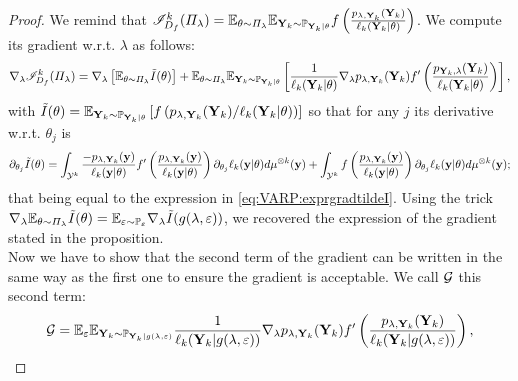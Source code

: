 \begin{proof}
    We remind that $\mathscr{I}^k_{D_f}(\varPi_\lambda)=\mathbb{E}_{\theta\sim\varPi_\lambda}\mathbb{E}_{\mathbf{Y}_k\sim\mathbb{P}_{\mathbf{Y}_k|\theta}}f\left(\frac{p_{\lambda,\mathbf{Y}_k}(\mathbf{Y}_k)}{\ell_k(\mathbf{Y}_k|\theta)}\right)$. 
    We compute its gradient w.r.t. $\lambda$ as follows: %
        \begin{align}
            \nabla_\lambda\mathscr{I}_{D_f}^k(\varPi_\lambda) = \nabla_\lambda\left[\mathbb{E}_{\theta\sim\varPi_\lambda}\tilde I(\theta)\right] + \mathbb{E}_{\theta\sim\varPi_\lambda}\mathbb{E}_{\mathbf{Y}_k\sim\mathbb{P}_{\mathbf{Y}_k|\theta}}\left[\frac{1}{\ell_k(\mathbf{Y}_k|\theta)}\nabla_\lambda p_{\lambda,\mathbf{Y}_k}(\mathbf{Y}_k)f'\left(\frac{p_{\mathbf{Y}_k,\lambda}(\mathbf{Y}_k)}{\ell_k(\mathbf{Y}_k|\theta)}\right)  \right],
        \end{align}
    with $\tilde I(\theta) = \mathbb{E}_{\mathbf{Y}_{k}\sim\mathbb{P}_{\mathbf{Y}_k|\theta}}\left[f\left({p_{\lambda,\mathbf{Y}_k}(\mathbf{Y}_k)}/{\ell_k(\mathbf{Y}_k|\theta)}\right)\right]  $ so that for any $j$ its derivative w.r.t. $\theta_j$ is 
        \begin{equation}
            \partial_{\theta_j}\tilde I(\theta) = %
             \int_{\cY^k} \frac{-p_{\lambda,\mbf Y_k}(\mbf y)}{\ell_k(\mbf y|\theta)} f'\left(\frac{p_{\lambda,\mbf Y_k}(\mbf y)}{\ell_k(\mbf y|\theta)}\right)\partial_{\theta_j}\ell_k(\mbf y|\theta) d\mu^{\otimes k}(\mbf y) + \int_{\cY^k}f\left(\frac{p_{\lambda,\mbf Y_k}(\mbf y)}{\ell_k(\mbf y|\theta)}\right)\partial_{\theta_j}\ell_k(\mbf y|\theta)d\mu^{\otimes k}(\mbf y);
        \end{equation}
    that being equal to the expression in \cref{eq:VARP:exprgradtildeI}. 
    Using the trick $\nabla_\lambda\mathbb{E}_{\theta\sim\varPi_\lambda}\tilde I(\theta)=\mathbb{E}_{\varepsilon\sim\mathbb{P}_\varepsilon}\nabla_\lambda\tilde I(g(\lambda,\varepsilon)) $, we recovered the expression of the gradient stated in the proposition.\\
    Now we have to show that the second term of the gradient can be written in the same way as the first one to ensure the gradient is acceptable. We call $\mathcal{G}$ this second term: 
        \begin{equation}
        \cG %
        = \EE_\eps\EE_{\mbf Y_k\sim\PP_{\mbf Y_k|g(\lambda,\eps)}}\frac{1}{\ell_k(\mbf Y_k|g(\lambda,\eps))}\nabla_\lambda p_{\lambda,\mbf Y_k}(\mbf Y_k)f'\left(\frac{p_{\lambda,\mbf Y_k}(\mbf Y_k)}{\ell_k(\mbf Y_k|g(\lambda,\eps))} \right),

\end{equation}
\end{proof}
